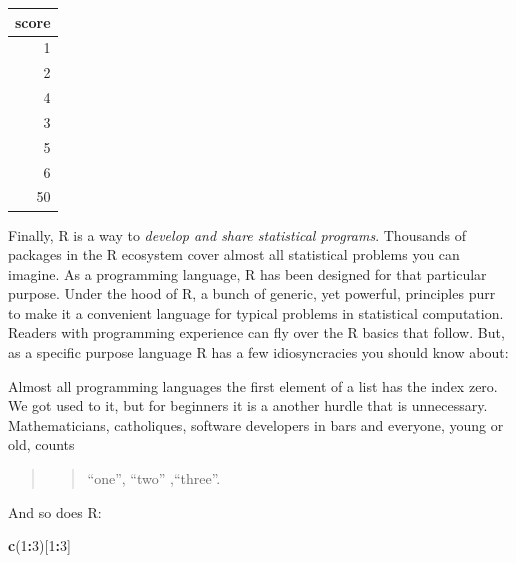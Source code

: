 \documentclass[]{svmono}
\newenvironment{Shaded}{\begin{snugshade}}{\end{snugshade}}
\newcommand{\KeywordTok}[1]{\textcolor[rgb]{0.13,0.29,0.53}{\textbf{#1}}}
\newcommand{\DataTypeTok}[1]{\textcolor[rgb]{0.13,0.29,0.53}{#1}}
\newcommand{\DecValTok}[1]{\textcolor[rgb]{0.00,0.00,0.81}{#1}}
\newcommand{\StringTok}[1]{\textcolor[rgb]{0.31,0.60,0.02}{#1}}
\newcommand{\OperatorTok}[1]{\textcolor[rgb]{0.81,0.36,0.00}{\textbf{#1}}}
\newcommand{\NormalTok}[1]{#1}
\begin{document}
\begin{Shaded}
\end{Shaded}

\begin{tabular}{r}
\hline
score\\
\hline
1\\
\hline
2\\
\hline
4\\
\hline
3\\
\hline
5\\
\hline
6\\
\hline
50\\
\hline
\end{tabular}

Finally, R is a way to \emph{develop and share statistical programs}.
Thousands of packages in the R ecosystem cover almost all statistical
problems you can imagine. As a programming language, R has been designed
for that particular purpose. Under the hood of R, a bunch of generic,
yet powerful, principles purr to make it a convenient language for
typical problems in statistical computation. Readers with programming
experience can fly over the R basics that follow. But, as a specific
purpose language R has a few idiosyncracies you should know about:

Almost all programming languages the first element of a list has the
index zero. We got used to it, but for beginners it is a another hurdle
that is unnecessary. Mathematicians, catholiques, software developers in
bars and everyone, young or old, counts

\begin{quote}
\begin{quote}
``one'', ``two'' ,``three''.
\end{quote}
\end{quote}

And so does R:

\begin{Shaded}
\begin{Highlighting}[]
\KeywordTok{c}\NormalTok{(}\DecValTok{1}\OperatorTok{:}\DecValTok{3}\NormalTok{)[}\DecValTok{1}\OperatorTok{:}\DecValTok{3}\NormalTok{]}
\end{Highlighting}
\end{Shaded}
\end{document}
